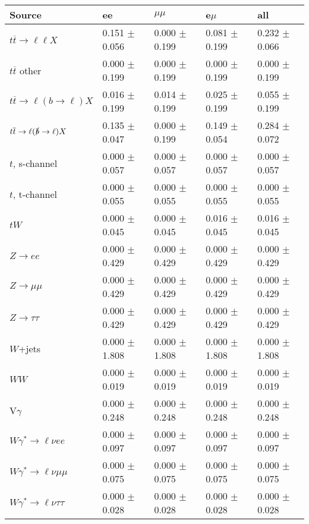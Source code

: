 \begin{tabular}{l | l l l l}
\hline\hline
 Source  &  ee  &  $\mu\mu$  &  e$\mu$  &  all \\
\hline
$t\overline{t}\rightarrow \ell\ell X$ &  0.151 $\pm$  0.056 &  0.000 $\pm$  0.199 &  0.081 $\pm$  0.199 &  0.232 $\pm$  0.066\\
$t\overline{t}$ other &  0.000 $\pm$  0.199 &  0.000 $\pm$  0.199 &  0.000 $\pm$  0.199 &  0.000 $\pm$  0.199\\
$t\overline{t}\rightarrow \ell(b\rightarrow \ell)X$ &  0.016 $\pm$  0.199 &  0.014 $\pm$  0.199 &  0.025 $\pm$  0.199 &  0.055 $\pm$  0.199\\
$t\overline{t}\rightarrow \ell(\slashed{b}\rightarrow \ell)X$ &  0.135 $\pm$  0.047 &  0.000 $\pm$  0.199 &  0.149 $\pm$  0.054 &  0.284 $\pm$  0.072\\
\hline
$t$, s-channel &  0.000 $\pm$  0.057 &  0.000 $\pm$  0.057 &  0.000 $\pm$  0.057 &  0.000 $\pm$  0.057\\
$t$, t-channel &  0.000 $\pm$  0.055 &  0.000 $\pm$  0.055 &  0.000 $\pm$  0.055 &  0.000 $\pm$  0.055\\
$tW$ &  0.000 $\pm$  0.045 &  0.000 $\pm$  0.045 &  0.016 $\pm$  0.045 &  0.016 $\pm$  0.045\\
\hline
$Z\rightarrow ee$ &  0.000 $\pm$  0.429 &  0.000 $\pm$  0.429 &  0.000 $\pm$  0.429 &  0.000 $\pm$  0.429\\
$Z\rightarrow\mu\mu$ &  0.000 $\pm$  0.429 &  0.000 $\pm$  0.429 &  0.000 $\pm$  0.429 &  0.000 $\pm$  0.429\\
$Z\rightarrow\tau\tau$ &  0.000 $\pm$  0.429 &  0.000 $\pm$  0.429 &  0.000 $\pm$  0.429 &  0.000 $\pm$  0.429\\
$W$+jets &  0.000 $\pm$  1.808 &  0.000 $\pm$  1.808 &  0.000 $\pm$  1.808 &  0.000 $\pm$  1.808\\
$WW$ &  0.000 $\pm$  0.019 &  0.000 $\pm$  0.019 &  0.000 $\pm$  0.019 &  0.000 $\pm$  0.019\\
\hline
V$\gamma$ &  0.000 $\pm$  0.248 &  0.000 $\pm$  0.248 &  0.000 $\pm$  0.248 &  0.000 $\pm$  0.248\\
$W\gamma^{*}\rightarrow\ell\nu e e$ &  0.000 $\pm$  0.097 &  0.000 $\pm$  0.097 &  0.000 $\pm$  0.097 &  0.000 $\pm$  0.097\\
$W\gamma^{*}\rightarrow\ell\nu\mu\mu$ &  0.000 $\pm$  0.075 &  0.000 $\pm$  0.075 &  0.000 $\pm$  0.075 &  0.000 $\pm$  0.075\\
$W\gamma^{*}\rightarrow\ell\nu\tau\tau$ &  0.000 $\pm$  0.028 &  0.000 $\pm$  0.028 &  0.000 $\pm$  0.028 &  0.000 $\pm$  0.028\\

\end{tabular}
